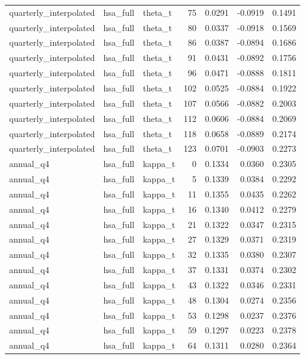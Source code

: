 \begin{tabular}{lllrrrr}
quarterly\_interpolated & hsa\_full & theta\_t & 75 & 0.0291 & -0.0919 & 0.1491 \\
quarterly\_interpolated & hsa\_full & theta\_t & 80 & 0.0337 & -0.0918 & 0.1569 \\
quarterly\_interpolated & hsa\_full & theta\_t & 86 & 0.0387 & -0.0894 & 0.1686 \\
quarterly\_interpolated & hsa\_full & theta\_t & 91 & 0.0431 & -0.0892 & 0.1756 \\
quarterly\_interpolated & hsa\_full & theta\_t & 96 & 0.0471 & -0.0888 & 0.1811 \\
quarterly\_interpolated & hsa\_full & theta\_t & 102 & 0.0525 & -0.0884 & 0.1922 \\
quarterly\_interpolated & hsa\_full & theta\_t & 107 & 0.0566 & -0.0882 & 0.2003 \\
quarterly\_interpolated & hsa\_full & theta\_t & 112 & 0.0606 & -0.0884 & 0.2069 \\
quarterly\_interpolated & hsa\_full & theta\_t & 118 & 0.0658 & -0.0889 & 0.2174 \\
quarterly\_interpolated & hsa\_full & theta\_t & 123 & 0.0701 & -0.0903 & 0.2273 \\
annual\_q4 & hsa\_full & kappa\_t & 0 & 0.1334 & 0.0360 & 0.2305 \\
annual\_q4 & hsa\_full & kappa\_t & 5 & 0.1339 & 0.0384 & 0.2292 \\
annual\_q4 & hsa\_full & kappa\_t & 11 & 0.1355 & 0.0435 & 0.2262 \\
annual\_q4 & hsa\_full & kappa\_t & 16 & 0.1340 & 0.0412 & 0.2279 \\
annual\_q4 & hsa\_full & kappa\_t & 21 & 0.1322 & 0.0347 & 0.2315 \\
annual\_q4 & hsa\_full & kappa\_t & 27 & 0.1329 & 0.0371 & 0.2319 \\
annual\_q4 & hsa\_full & kappa\_t & 32 & 0.1335 & 0.0380 & 0.2307 \\
annual\_q4 & hsa\_full & kappa\_t & 37 & 0.1331 & 0.0374 & 0.2302 \\
annual\_q4 & hsa\_full & kappa\_t & 43 & 0.1322 & 0.0346 & 0.2331 \\
annual\_q4 & hsa\_full & kappa\_t & 48 & 0.1304 & 0.0274 & 0.2356 \\
annual\_q4 & hsa\_full & kappa\_t & 53 & 0.1298 & 0.0237 & 0.2376 \\
annual\_q4 & hsa\_full & kappa\_t & 59 & 0.1297 & 0.0223 & 0.2378 \\
annual\_q4 & hsa\_full & kappa\_t & 64 & 0.1311 & 0.0280 & 0.2364 \\

\end{tabular}
